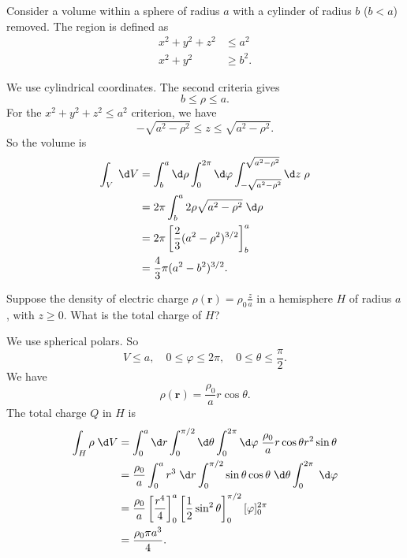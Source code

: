\documentclass[a4paper]{article}
\begin{document}
\begin{eg}
  Consider a volume within a sphere of radius $a$ with a cylinder of radius $b$ ($b < a$) removed. The region is defined as
  \begin{align*}
    x^2 + y^2 + z^2 &\leq a^2\\
    x^2 + y^2 &\geq b^2.
  \end{align*}
  \begin{center}
  \end{center}
  We use cylindrical coordinates. The second criteria gives
  \[
    b \leq \rho \leq a.
  \]
  For the $x^2 + y^2 + z^2 \leq a^2$ criterion, we have
  \[
    -\sqrt{a^2 - \rho^2} \leq z \leq \sqrt{a^2 - \rho^2}.
  \]
  So the volume is
  \begin{align*}
    \int_V \;\d V &= \int_b^a\d \rho\int_0^{2\pi}\d \varphi \int_{-\sqrt{a^2 - \rho^2}}^{\sqrt{a^2 - \rho^2}}\d z\; \rho\\
    &= 2\pi\int_b^a 2\rho\sqrt{a^2 - \rho^2}\;\d \rho\\
    &= 2\pi \left[\frac{2}{3}(a^2 - \rho^2)^{3/2}\right]^a_b\\
    &= \frac{4}{3}\pi (a^2 - b^2)^{3/2}.
  \end{align*}
\end{eg}
\begin{eg}
  Suppose the density of electric charge $\rho(\mathbf{r}) = \rho_0 \frac{z}{a}$ in a hemisphere $H$ of radius $a$, with $z \geq 0$. What is the total charge of $H$?

  We use spherical polars. So
  \[
    V \leq a,\quad 0 \leq \varphi \leq 2\pi,\quad 0 \leq \theta \leq \frac{\pi}{2}.
  \]
  We have
  \[
    \rho(\mathbf{r}) = \frac{\rho_0}{a}r\cos \theta.
  \]
  The total charge $Q$ in $H$ is
  \begin{align*}
    \int_H \rho \;\d V &= \int_0^a\d r\int_0^{\pi/2}\d \theta\int_0^{2\pi}\d\varphi\; \frac{\rho_0}{a}r\cos\theta r^2\sin\theta\\
    &= \frac{\rho_0}{a}\int_0^a r^3 \;\d r \int_0^{\pi/2}\sin\theta \cos\theta\;\d \theta \int_0^{2\pi}\;\d \varphi\\
    &= \frac{\rho_0}{a}\left[\frac{r^4}{4}\right]^a_0\left[\frac{1}{2}\sin^2\theta\right]^{\pi/2}_0 [\varphi]^{2\pi}_0\\
    &= \frac{\rho_0 \pi a^3}{4}.
  \end{align*}
\end{eg}
\end{document}
